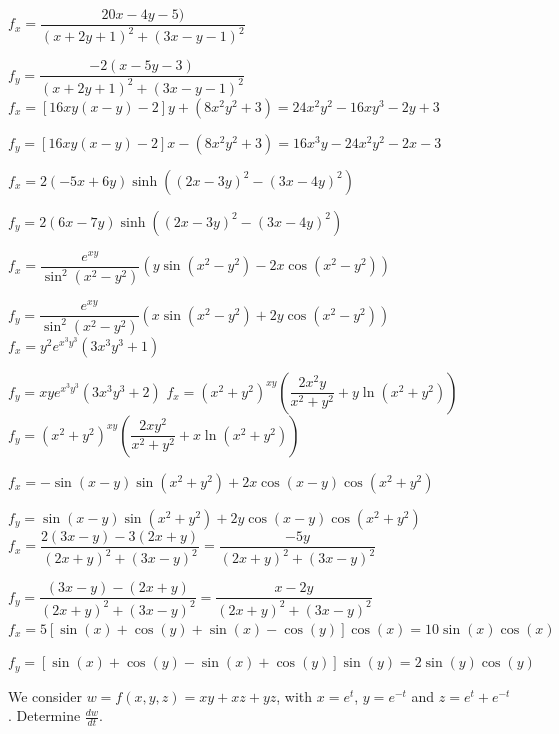 \begin{Answer}
    
    \Question $f_x = \dfrac{20x-4y-5)}{\left(x+2y+1\right)^2+\left(3x-y-1\right)^2}$
    
     $f_y = \dfrac{-2(x-5y-3)}{\left(x+2y+1\right)^2+\left(3x-y-1\right)^2}$
    \ifcalculus
    \Question $f_x = [16xy(x-y)-2]y + (8x^2y^2+3) = 24x^2y^2 - 16xy^3 - 2y + 3$
   
    $f_y = [16xy(x-y)-2]x - (8x^2y^2+3) = 16x^3y - 24x^2y^2 - 2x - 3$
    \fi
    
    \ifanalysis
    \Question $f_x = 2\left(-5x+6y\right)\sinh\left((2x-3y)^2-(3x-4y)^2\right)$
    
     $f_y = 2\left(6x-7y\right)\sinh\left((2x-3y)^2-(3x-4y)^2\right)$
    \fi
    
    \Question $f_x = \dfrac{e^{xy}}{\sin^2\left(x^2-y^2\right)} \left(y\sin \left(x^2-y^2\right)-2x\cos\left(x^2-y^2\right)\right)$
    
     $f_y = \dfrac{e^{xy}}{\sin^2\left(x^2-y^2\right)} \left(x\sin \left(x^2-y^2\right)+2y\cos\left(x^2-y^2\right)\right)$
    \Question $f_x = y^2e^{x^3y^3}\left(3x^3y^3+1\right)$
    
     $f_y = xy e^{x^3y^3}\left(3x^3y^3+2\right)$
    \Question $f_x = \left(x^2+y^2\right)^{xy}\left(\dfrac{2x^2y}{x^2+y^2} + y\ln\left(x^2+y^2\right)\right)$
     $f_y = \left(x^2+y^2\right)^{xy}\left(\dfrac{2xy^2}{x^2+y^2} + x\ln\left(x^2+y^2\right)\right)$
    
    \ifcalculus
    \Question $f_x = -\sin(x-y)\sin(x^2+y^2) + 2x\cos(x-y)\cos(x^2+y^2)$
    
     $f_y = \sin(x-y)\sin(x^2+y^2) + 2y\cos(x-y)\cos(x^2+y^2)$ 
    \Question $f_x = \dfrac{2(3x-y)-3(2x+y)}{(2x+y)^2+(3x-y)^2} = \dfrac{-5y}{(2x+y)^2+(3x-y)^2}$
    
    $f_y = \dfrac{(3x-y)-(2x+y)}{(2x+y)^2+(3x-y)^2} = \dfrac{x-2y}{(2x+y)^2+(3x-y)^2}$
    \Question $f_x = 5[\sin(x)+\cos(y)+\sin(x)-\cos(y)]\cos(x) = 10\sin(x)\cos(x)$
    
     $f_y = [\sin(x)+\cos(y)-\sin(x)+\cos(y)]\sin(y) = 2\sin(y)\cos(y)$
    \fi
    
\end{Answer}


\ifcalculus \begin{Exercise}[difficulty = 1] We consider $w=f(x,y,z)=xy+xz+yz$, with $x=e^t$, $y=e^{-t}$ and $z=e^t+e^{-t}$. Determine $\frac{dw}{dt}$.
\end{Exercise}

